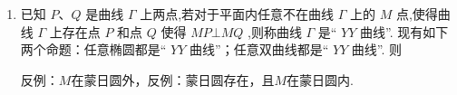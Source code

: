 \begin{enumerate}
\begin{jieda}
\begin{enumerate}
            $k_{PM} = 0$时，依然满足$PM$过定点$Q(4, 0)$，又因为$BQ \bot x$轴，所以 $S = S_{\triangle BMP} + S_{\triangle CMP} = S_{\triangle BQP} - S_{\triangle BQM} + S_{\triangle CMP} = \dfrac{1}{2}|BQ| \times |x_1 - x_2| + \dfrac{1}{2}|PM| \times h_{C-PM} \geq \dfrac{1}{2}|BQ| \times |x_1 - x_2| + \dfrac{1}{2}|PM| \times (h_{E-PM}-1)$

            易知当$PM$与$x$轴重合时，$|x_1-x_2|$最小，$|PM|$最小，$h_{E-PM}$最小，因此$S$此时最小，为$2+2\sqrt{3}$
        \end{enumerate}
    \end{jieda}
    \item 已知 $P\text{、}Q$ 是曲线 $\Gamma$ 上两点,若对于平面内任意不在曲线 $\Gamma$ 上的 $M$ 点,使得曲线 $\Gamma$ 上存在点 $P$ 和点 $Q$ 使得 ${MP}\bot {MQ}$ ,则称曲线 $\Gamma$ 是“ ${YY}$ 曲线”. 现有如下两个命题：任意椭圆都是“ ${YY}$ 曲线”；任意双曲线都是“ ${YY}$ 曲线”. 则
    \begin{jieda}
        反例：$M$在蒙日圆外，反例：蒙日圆存在，且$M$在蒙日圆内.
    \end{jieda}
\end{enumerate}